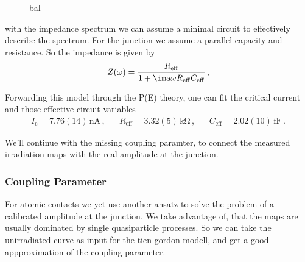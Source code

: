         \begin{figure}
            \centering
            \hfill
            \hfill
            \caption{bal}
            \label{fig:ac:contact1:supercurrent}
        \end{figure}

        with the impedance spectrum we can assume a minimal circuit to effectively describe the spectrum. For the junction we assume a parallel capacity and resistance. So the impedance is given by 
        \begin{equation}
            Z(\omega) = \frac{R_\mathrm{eff}}{1+ \ima\omega R_\mathrm{eff}C_\mathrm{eff}}\,,
            \label{eq:ac:photon-assisted-transport:impedance}
        \end{equation}

        Forwarding this model through the P(E) theory, one can fit the critical current and those effective circuit variables
        \begin{align}
            I_\mathrm{c} = 7.76(14)\,\mathrm{nA}\,, &&
            R_\mathrm{eff} = 3.32(5)\,\mathrm{k\Omega}\,, &&
            C_\mathrm{eff} = 2.02(10)\,\mathrm{fF}\,.
            \label{eq:ac:contact1:icpt-parameter}
        \end{align}

        We'll continue with the missing coupling paramter, to connect the measured irradiation maps with the real amplitude at the junction.

    \subsubsection*{Coupling Parameter}

        For atomic contacts we yet use another ansatz to solve the problem of a calibrated amplitude at the junction. We take advantage of, that the maps are usually dominated by single quasiparticle processes. So we can take the unirradiated curve as input for the tien gordon modell, and get a good appproximation of the coupling parameter.

